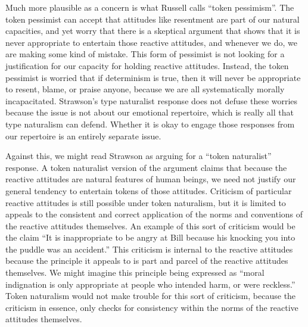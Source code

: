 \documentclass[phd,12pt,oneside,paper=letterpaper]{ubcthesis}
\begin{document}
Much more plausible as a concern is what Russell calls ``token pessimism''. The token pessimist can accept that attitudes like resentment are part of our natural capacities, and yet worry that there is a skeptical argument that shows that it is never appropriate to entertain those reactive attitudes, and whenever we do, we are making some kind of mistake. This form of pessimist is not looking for a justification for our capacity for holding reactive attitudes. Instead, the token pessimist is worried that if determinism is true, then it will never be appropriate to resent, blame, or praise anyone, because we are all systematically morally incapacitated.  Strawson's type naturalist response does not defuse these worries because the issue is not about our emotional repertoire, which is really all that type naturalism can defend. Whether it is okay to engage those responses from our repertoire is an entirely separate issue.

Against this, we might read Strawson as arguing for a ``token naturalist'' response. A token naturalist version of the argument claims that because the reactive attitudes are natural features of human beings, we need not justify our general tendency to entertain tokens of those attitudes. Criticism of particular reactive attitudes is still possible under token naturalism, but it is limited to appeals to the consistent and correct application of the norms and conventions of the reactive attitudes themselves. An example of this sort of criticism would be the claim ``It is inappropriate to be angry at Bill because his knocking you into the puddle was an accident.'' This criticism is internal to the reactive attitudes because the principle it appeals to is part and parcel of the reactive attitudes themselves. We might imagine this principle being expressed as ``moral indignation is only appropriate at people who intended harm, or were reckless.'' Token naturalism would not make trouble for this sort of criticism, because the criticism in essence, only checks for consistency within the norms of the reactive attitudes themselves. 
\end{document}
